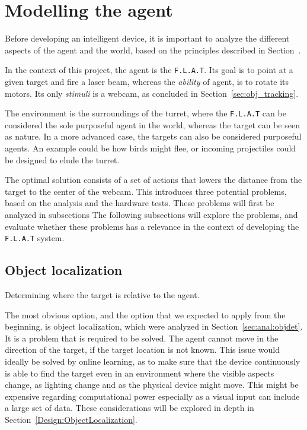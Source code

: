 \section{Modelling the agent}\label{Design:MI}
Before developing an intelligent device, it is important to analyze the different aspects of the agent and the world, based on the principles described in Section~.


In the context of this project, the agent is the \texttt{F.L.A.T}.
Its goal is to point at a given target and fire a laser beam, whereas the \textit{ability} of agent, is to rotate its motors.
Its only \textit{stimuli} is a webcam, as concluded in Section~\ref{sec:obj_tracking}.

The environment is the surroundings of the turret, where the \texttt{F.L.A.T} can be considered the sole purposeful agent in the world, whereas the target can be seen as nature.
In a more advanced case, the targets can also be considered purposeful agents.
An example could be how birds might flee, or incoming projectiles could be designed to elude the turret.

The optimal solution consists of a set of actions that lowers the distance from the target to the center of the webcam.
This introduces three potential problems, based on the analysis and the hardware tests.
These problems will first be analyzed in subsections
The following subsections  will explore the problems, and evaluate whether these problems has a relevance in the context of developing the \texttt{F.L.A.T} system. 


\subsection{Object localization}
Determining where the target is relative to the agent.


The most obvious option, and the option that we expected to apply from the beginning, is object localization, which were analyzed in Section~\ref{sec:anal:objdet}.
It is a problem that is required to be solved. The agent cannot move in the direction of the target, if the target location is not known.
This issue would ideally be solved by online learning, as to make sure that the device continuously is able to find the target even in an environment where the visible aspects change, as lighting change and as the physical device might move. 
This might be expensive regarding computational power especially as a visual input can include a large set of data.
These considerations will be explored in depth in Section~\ref{Design:ObjectLocalization}.

